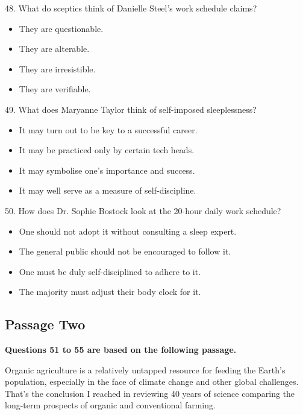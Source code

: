 \documentclass[UTF8,11pt]{ctexart}
\begin{document}
48. What do sceptics think of Danielle Steel's work schedule claims?


\begin{itemize}[leftmargin=2em,itemsep=.2em,topsep=.4em]\item[A.] They are questionable.
\item[B.] They are alterable.
\item[C.] They are irresistible.
\item[D.] They are verifiable.
\end{itemize}

49. What does Maryanne Taylor think of self-imposed sleeplessness?


\begin{itemize}[leftmargin=2em,itemsep=.2em,topsep=.4em]\item[A.] It may turn out to be key to a successful career.
\item[B.] It may be practiced only by certain tech heads.
\item[C.] It may symbolise one's importance and success.
\item[D.] It may well serve as a measure of self-discipline.
\end{itemize}

50. How does Dr. Sophie Bostock look at the 20-hour daily work schedule?


\begin{itemize}[leftmargin=2em,itemsep=.2em,topsep=.4em]\item[A.] One should not adopt it without consulting a sleep expert.
\item[B.] The general public should not be encouraged to follow it.
\item[C.] One must be duly self-disciplined to adhere to it.
\item[D.] The majority must adjust their body clock for it.
\end{itemize}

\subsection*{\textbf{Passage Two}}


\textbf{Questions 51 to 55 are based on the following passage.}


Organic agriculture is a relatively untapped resource for feeding the Earth's population, especially in the face of climate change and other global challenges. That's the conclusion I reached in reviewing 40 years of science comparing the long-term prospects of organic and conventional farming.
\end{document}
